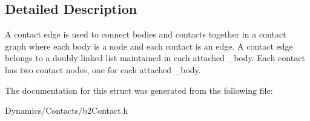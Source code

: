 \subsection{Detailed Description}
A contact edge is used to connect bodies and contacts together in a contact graph where each body is a node and each contact is an edge. A contact edge belongs to a doubly linked list maintained in each attached _body. Each contact has two contact nodes, one for each attached _body.

The documentation for this struct was generated from the following file\+:\begin{DoxyCompactItemize}
\item 
Dynamics/\+Contacts/b2\+Contact.\+h\end{DoxyCompactItemize}
